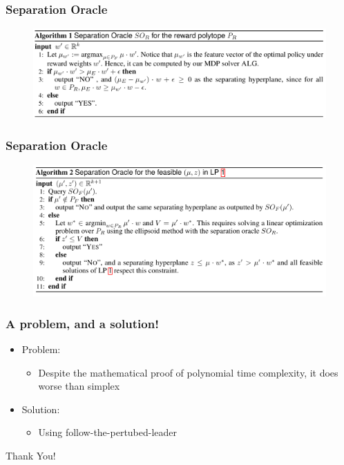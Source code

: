 \documentclass[aspectratio=169]{beamer}
\begin{document}
\begin{frame}
	\frametitle{Separation Oracle}
	\begin{figure}
		\centering
		\includegraphics[scale=.60]{so.png}
	\end{figure}
\end{frame}

\begin{frame}
	\frametitle{Separation Oracle}
	\begin{figure}
		\centering
		\includegraphics[scale=.60]{somain.png}
	\end{figure}
\end{frame}

\begin{frame}
	\frametitle{A problem, and a solution!}
	\begin{itemize}
		\item Problem:
		\begin{itemize}
			\item Despite the mathematical proof of polynomial time complexity, it does worse than simplex
		\end{itemize}
		\item Solution:
		\begin{itemize}
			\item Using follow-the-pertubed-leader
		\end{itemize}
	\end{itemize}
\end{frame}


\begin{frame}
	\begin{center}
		\Huge Thank You!
	\end{center}
\end{frame}

\end{document}
